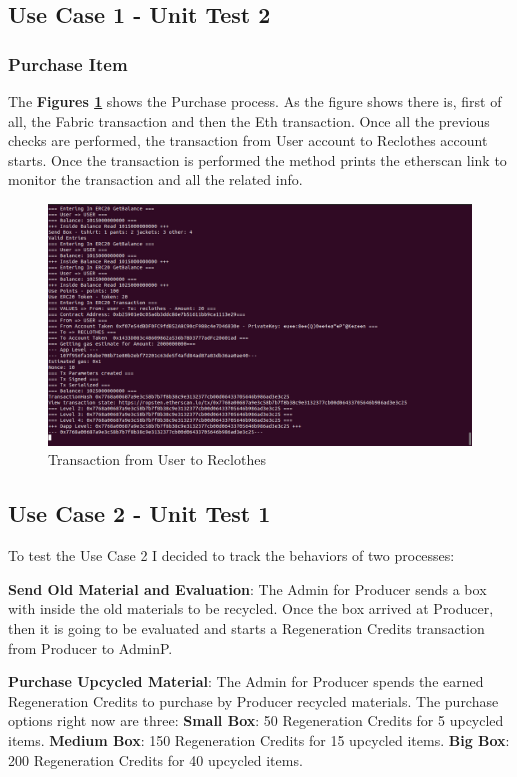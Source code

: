 \subsection{Use Case 1 - Unit Test 2}

\subsubsection{Purchase Item}

The \textbf{Figures \ref{fig:tx-user-reclothes}} shows the Purchase process. As the figure shows
there is, first of all, the Fabric transaction and then the Eth transaction. Once all
the previous checks are performed, the transaction from User account to Reclothes account starts. Once the 
transaction is performed the method prints the etherscan link to monitor the transaction and
all the related info. 

\begin{figure}[h!]
	\centering
    \includegraphics[totalheight=7cm]{img/test/test2/tx-user-reclothes.png}
	\caption{Transaction from User to Reclothes}
	\label{fig:tx-user-reclothes}
\end{figure}


\subsection{Use Case 2 - Unit Test 1}

To test the Use Case 2 I decided to track the behaviors of two processes:

\begin{outline}
    \1 \textbf{Send Old Material and Evaluation}: The Admin for Producer sends a box with inside the old materials
    to be recycled. Once the box arrived at Producer, then it is going to be evaluated and starts a 
    Regeneration Credits transaction from Producer to AdminP.

    \1 \textbf{Purchase Upcycled Material}: The Admin for Producer spends the earned Regeneration Credits
    to purchase by Producer recycled materials. The purchase options right now are three:
    \2 \textbf{Small Box}: 50 Regeneration Credits for 5 upcycled items.
    \2 \textbf{Medium Box}: 150 Regeneration Credits for 15 upcycled items.
    \2 \textbf{Big Box}: 200 Regeneration Credits for 40 upcycled items.
\end{outline}

